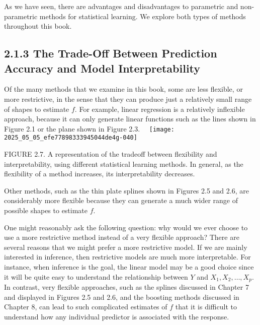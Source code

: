 \documentclass[10pt]{article}
\begin{document}
As we have seen, there are advantages and disadvantages to parametric and non-parametric methods for statistical learning. We explore both types of methods throughout this book.

\subsection*{2.1.3 The Trade-Off Between Prediction Accuracy and Model Interpretability}
Of the many methods that we examine in this book, some are less flexible, or more restrictive, in the sense that they can produce just a relatively small range of shapes to estimate $f$. For example, linear regression is a relatively inflexible approach, because it can only generate linear functions such as the lines shown in Figure 2.1 or the plane shown in Figure 2.3.\
\
\texttt{[image: 2025\_05\_05\_efe77898333945044de4g-040]}

FIGURE 2.7. A representation of the tradeoff between flexibility and interpretability, using different statistical learning methods. In general, as the flexibility of a method increases, its interpretability decreases.

Other methods, such as the thin plate splines shown in Figures 2.5 and 2.6, are considerably more flexible because they can generate a much wider range of possible shapes to estimate $f$.

One might reasonably ask the following question: why would we ever choose to use a more restrictive method instead of a very flexible approach? There are several reasons that we might prefer a more restrictive model. If we are mainly interested in inference, then restrictive models are much more interpretable. For instance, when inference is the goal, the linear model may be a good choice since it will be quite easy to understand the relationship between $Y$ and $X_{1}, X_{2}, \ldots, X_{p}$. In contrast, very flexible approaches, such as the splines discussed in Chapter 7 and displayed in Figures 2.5 and 2.6, and the boosting methods discussed in Chapter 8, can lead to such complicated estimates of $f$ that it is difficult to understand how any individual predictor is associated with the response.
\end{document}
